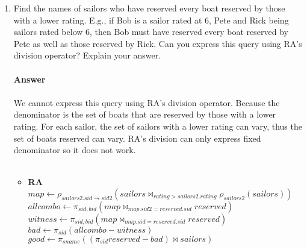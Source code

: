 \documentclass{article}
\newcommand{\anyvar}{\underline{\hspace{0.8em}}}
\newcommand{\RA}{\textbf{RA}}
\newcommand{\DL}{\textbf{Datalog}}
\begin{document}
\begin{enumerate}
	\begin{itemize}
	\item \RA \\
	$ notoldest \gets \pi_{sailors.sid}(sailors \bowtie_{sailors.age < sailors2.age} \rho_{sailors2}(sailors))$ \\
	$ oldest \gets \pi_{sname, rating}((\pi_{sid} sailors - notoldest) \bowtie sailors) $
	\item \DL \\
	$ notoldest(S) \gets sailors(S, \anyvar, \anyvar, A),\ sailors(S', \anyvar, \anyvar, A'),\ A < A' $ \\
	$ oldest(N, R) \gets sailors(S, N, R, \anyvar),\ \neg notoldest(S) $
	\end{itemize}
\item Find the names of sailors who have reserved every boat reserved by those with a lower rating. E.g., if Bob is a sailor rated at 6, Pete and Rick being sailors rated below 6, then Bob must have reserved every boat reserved by Pete as well as those reserved by Rick. Can you express this query using RA's division operator? Explain your answer.\\
\\
\textbf{Answer}\\
\\
We cannot express this query using RA's division operator. Because the denominator is the set of boats that are reserved by those with a lower rating. For each sailor, the set of sailors with a lower rating can vary, thus the set of boats reserved can vary. RA's division can only express fixed denominator so it does not work.\\
\\
\begin{itemize}
	\item \RA \\
	$ map \gets \rho_{sailors2.sid \to sid2}(sailors \bowtie_{rating > sailors2.rating} \rho_{sailors2} (sailors)) $ \\
	$ allcombo \gets \pi_{sid, bid}(map \bowtie_{map.sid2 = reserved.sid} reserved) $ \\
	$ witness \gets \pi_{sid, bid}(map \bowtie_{map.sid = reserved.sid} reserved)$ \\
	$ bad \gets \pi_{sid} (allcombo - witness) $ \\
	$ good \gets \pi_{sname}((\pi_{sid} reserved - bad) \bowtie sailors) $ \\
	

\end{itemize}
\end{enumerate}
\end{document}
